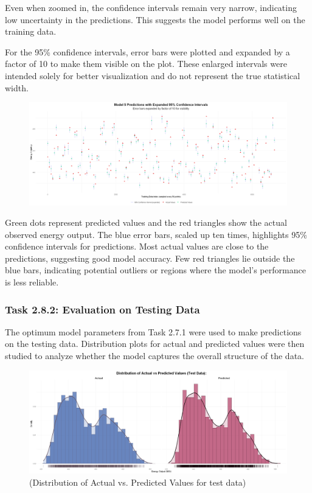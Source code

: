\documentclass[12pt,a4paper]{article}
\begin{document}
Even when zoomed in, the confidence intervals remain very narrow, 
indicating low uncertainty in the predictions. This
suggests the model performs well on the training data.

For the 95\% confidence intervals, error bars were plotted 
and expanded by a factor of 10 to make them visible on the plot. 
These enlarged intervals were intended solely for better visualization 
and do not represent the true statistical width.

\begin{figure}[H]
  \centering
  \includegraphics[width=\textwidth]{y19.png}
\end{figure}

Green dots represent predicted values and the red triangles show 
the actual observed energy output. The blue error bars, scaled up 
ten times, highlights 95\% confidence intervals for predictions. 
Most actual values are close to the predictions, suggesting 
good model accuracy. Few red triangles lie outside the blue bars, 
indicating potential outliers or regions where the model's performance 
is less reliable.

\subsubsection*{Task 2.8.2: Evaluation on Testing Data}

The optimum model parameters from Task 2.7.1 were used to make predictions on the testing data. 
Distribution plots for actual and predicted values were then studied to analyze whether the model 
captures the overall structure of the data. 

\begin{figure}[H]
  \centering
  \includegraphics[width=\textwidth]{y20.png}
  \caption{(Distribution of Actual vs. Predicted Values for test data)}
  \label{fig:Actual vs. Predicted for testing data}
\end{figure}
\end{document}
